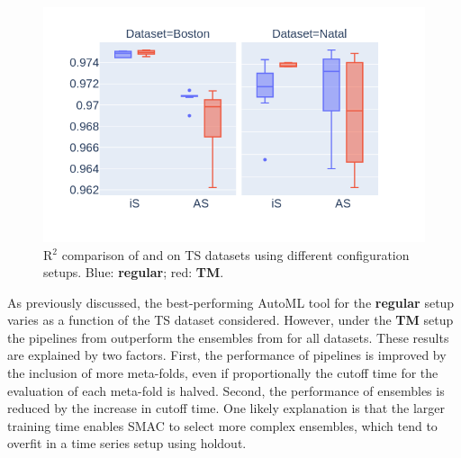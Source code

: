 \begin{figure}
    \centering
    \includegraphics[width=0.8\linewidth, clip=true, trim=45px 50px 80px 30px]{img/ts-setups.png}
    \caption{R$^2$ comparison of \tinyisklearn and \autosklearn on TS datasets using different configuration setups. Blue: \textbf{regular}; red: \textbf{TM}.}
    \label{fig:ts-setups}
\end{figure}

As previously discussed, the best-performing AutoML tool for the \textbf{regular} setup varies as a function of the TS dataset considered. However, under the \textbf{TM} setup the pipelines from \isklearn outperform the ensembles from \autosklearn for all datasets.
These results are explained by two factors. First, the performance of \isklearn pipelines is improved by the inclusion of more meta-folds, even if proportionally the cutoff time for the evaluation of each meta-fold is halved. Second, the performance of \autosklearn ensembles is reduced by the increase in cutoff time. One likely explanation is that the larger training time enables SMAC to select more complex ensembles, which tend to overfit in a time series setup using holdout.


